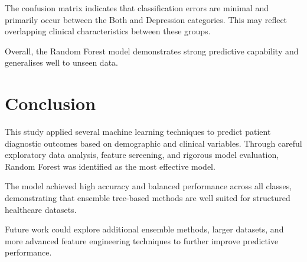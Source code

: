 \documentclass[11pt]{article}
\begin{document}
The confusion matrix indicates that classification errors are minimal and primarily occur between the Both and Depression categories. This may reflect overlapping clinical characteristics between these groups.

Overall, the Random Forest model demonstrates strong predictive capability and generalises well to unseen data.

\section{Conclusion}

This study applied several machine learning techniques to predict patient diagnostic outcomes based on demographic and clinical variables. Through careful exploratory data analysis, feature screening, and rigorous model evaluation, Random Forest was identified as the most effective model.

The model achieved high accuracy and balanced performance across all classes, demonstrating that ensemble tree-based methods are well suited for structured healthcare datasets.

Future work could explore additional ensemble methods, larger datasets, and more advanced feature engineering techniques to further improve predictive performance.
\end{document}
